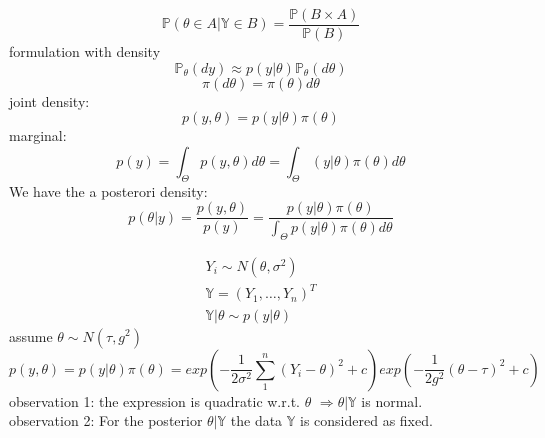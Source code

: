 \begin{definition}[posterori]
	\begin{equation*}
		\mathbb{P}(\theta \in A | \mathbb{Y} \in B) = \frac{\mathbb{P} (B \times A)}{\mathbb{P}(B)}
	\end{equation*}
	formulation with density
	\begin{equation*}
		\mathbb{P}_\theta(dy) \approx p(y|\theta) \mathbb{P}_\theta(d\theta)
	\end{equation*}
	\begin{equation*}
		\pi(d\theta) = \pi(\theta) d\theta
	\end{equation*}
	joint density:
	\begin{equation*}
		p(y, \theta) = p(y|\theta) \pi(\theta)
	\end{equation*}
	marginal:
	\begin{equation*}
		p(y) = \int_\Theta p(y, \theta) d\theta = \int_\Theta(y|\theta) \pi(\theta)d\theta
	\end{equation*}
	We have the a posterori density:
	\begin{equation}\label{equ: apd}
		p(\theta|y) = \frac{p(y, \theta)}{p(y)} = \frac{p(y|\theta)\pi(\theta)}{\int_\Theta p(y|\theta) \pi(\theta) d\theta}
	\end{equation}
\end{definition}


\begin{example}
\begin{align*}
	Y_i \sim N(\theta, \sigma^2)\\
	\mathbb{Y} = (Y_1, \dots, Y_n)^T\\
	\mathbb{Y}|\theta \sim p(y|\theta) 
\end{align*}
assume $\theta \sim N(\tau, g^2)$
\begin{equation*}
	p(y, \theta) = p(y|\theta) \pi(\theta) = exp(-\frac{1}{2\sigma^2} \sum_1^n (Y_i - \theta)^2 + c) exp(-\frac{1}{2g^2}(\theta-\tau)^2 + c)
\end{equation*}
observation 1: the expression is quadratic w.r.t. $\theta$ $\Rightarrow \theta|\mathbb{Y}$ is normal.\\
observation 2: For the posterior $\theta|\mathbb{Y}$ the data $\mathbb{Y}$ is considered as fixed. 
\end{example}

